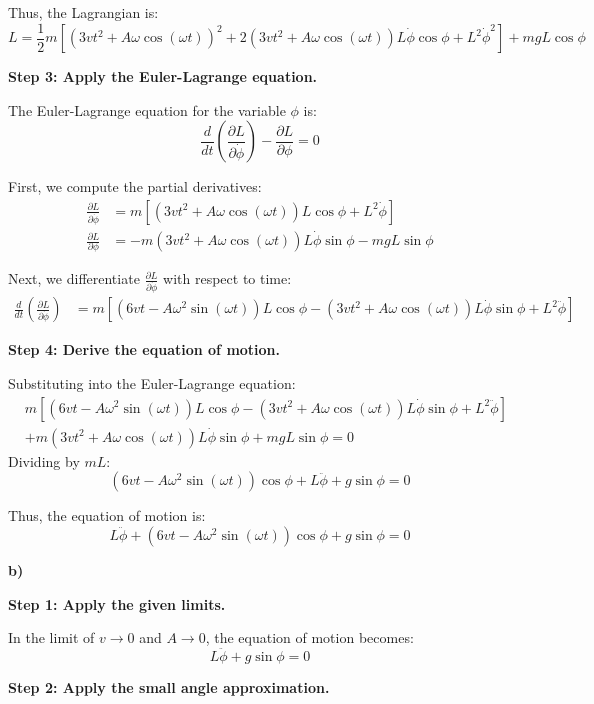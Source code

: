\documentclass{article}
\begin{document}
Thus, the Lagrangian is:
$$L = \frac{1}{2} m \left[ (3vt^2 + A\omega \cos(\omega t))^2 + 2(3vt^2 + A\omega \cos(\omega t))L \dot{\phi} \cos \phi + L^2 \dot{\phi}^2 \right] + mgL \cos \phi$$

\textbf{Step 3: Apply the Euler-Lagrange equation.}

The Euler-Lagrange equation for the variable $\phi$ is:
$$\frac{d}{dt} \left( \frac{\partial L}{\partial \dot{\phi}} \right) - \frac{\partial L}{\partial \phi} = 0$$

First, we compute the partial derivatives:
\begin{align*}
\frac{\partial L}{\partial \dot{\phi}} &= m \left[ (3vt^2 + A\omega \cos(\omega t))L \cos \phi + L^2 \dot{\phi} \right] \\
\frac{\partial L}{\partial \phi} &= -m(3vt^2 + A\omega \cos(\omega t))L \dot{\phi} \sin \phi - mgL \sin \phi
\end{align*}

Next, we differentiate $\frac{\partial L}{\partial \dot{\phi}}$ with respect to time:
\begin{align*}
\frac{d}{dt} \left( \frac{\partial L}{\partial \dot{\phi}} \right) &= m \left[ (6vt - A\omega^2 \sin(\omega t))L \cos \phi - (3vt^2 + A\omega \cos(\omega t))L \dot{\phi} \sin \phi + L^2 \ddot{\phi} \right]
\end{align*}

\textbf{Step 4: Derive the equation of motion.}

Substituting into the Euler-Lagrange equation:
\begin{align*}
&m \left[ (6vt - A\omega^2 \sin(\omega t))L \cos \phi - (3vt^2 + A\omega \cos(\omega t))L \dot{\phi} \sin \phi + L^2 \ddot{\phi} \right] \\
&+ m(3vt^2 + A\omega \cos(\omega t))L \dot{\phi} \sin \phi + mgL \sin \phi = 0
\end{align*}
Dividing by $mL$:
$$(6vt - A\omega^2 \sin(\omega t)) \cos \phi + L \ddot{\phi} + g \sin \phi = 0$$

Thus, the equation of motion is:
$$L \ddot{\phi} + (6vt - A\omega^2 \sin(\omega t)) \cos \phi + g \sin \phi = 0$$

\textbf{b)}

\textbf{Step 1: Apply the given limits.}

In the limit of $v \to 0$ and $A \to 0$, the equation of motion becomes:
$$L \ddot{\phi} + g \sin \phi = 0$$

\textbf{Step 2: Apply the small angle approximation.}
\end{document}
